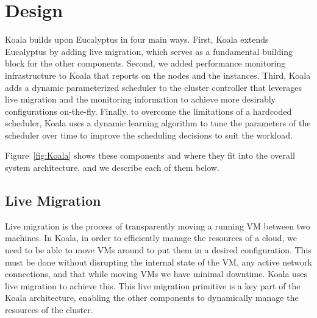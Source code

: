 \section{Design}
\label{sec:design}




Koala builds upon Eucalyptus in four main ways.  First, Koala extends
Eucalyptus by adding live migration, which serves as a fundamental building
block for the other components.  Second, we added performance monitoring
infrastructure to Koala that reports on the nodes and the instances. Third,
Koala adds a dynamic parameterized scheduler to the cluster controller that
leverages live migration and the monitoring information to achieve more
desirably configurations on-the-fly.  Finally, to overcome the limitations of a
hardcoded scheduler, Koala uses a dynamic learning algorithm to tune the
parameters of the scheduler over time to improve the scheduling decisions to
suit the workload.

Figure~\ref{fig:Koala} shows these components and where they fit into the
overall system architecture, and we describe each of them below.


\subsection{Live Migration}
Live migration is the process of transparently moving a running VM between two
machines.  In Koala, in order to efficiently manage the resources of a cloud,
we need to be able to move VMs around to put them in a desired configuration.
This must be done without disrupting the internal state of the VM, any active
network connections, and that while moving VMs we have minimal downtime.  Koala
uses live migration to achieve this.  This live migration primitive is a key
part of the Koala architecture, enabling the other components to dynamically
manage the resources of the cluster.

